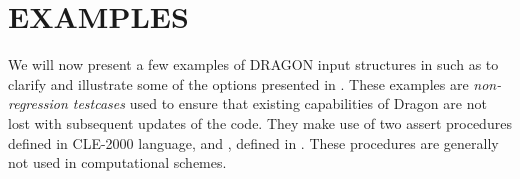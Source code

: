 \section{EXAMPLES}\label{sect:Examples}

We will now present a few examples of DRAGON input structures in such as to
clarify and illustrate some of the options presented in
. These examples are
{\sl non-regression testcases} used to
ensure that existing capabilities of Dragon are not lost with subsequent
updates of the code. They make use of two assert procedures defined in CLE-2000
language,  and , defined in . These
procedures are generally not used in computational schemes.








